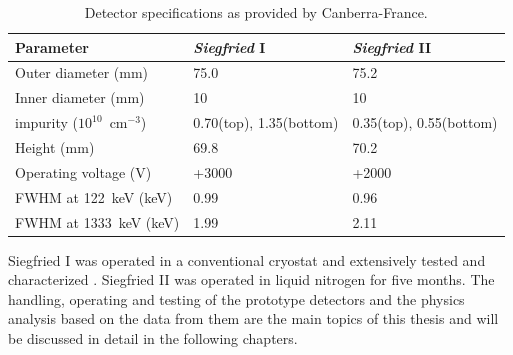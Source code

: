 \begin{table}[tbhp]
\centering
\caption{Detector specifications as provided by Canberra-France.}
\label{tab:tt:detpar}
\begin{tabular}{lll}\\\hline
Parameter & \emph{Siegfried} I  & \emph{Siegfried} II \\\hline
Outer diameter (mm)   & 75.0 & 75.2\\ 
Inner diameter (mm)   & 10 & 10 \\ 
impurity ($10^{10}$~cm$^{-3}$) & 0.70(top), 1.35(bottom) & 0.35(top), 0.55(bottom) \\
Height (mm)           & 69.8 & 70.2 \\\hline 
Operating voltage (V) & +3000 & +2000 \\ 
FWHM at 122~keV (keV)  & 0.99 & 0.96 \\ 
FWHM at 1333~keV (keV) & 1.99 & 2.11 \\ \hline 
\end{tabular}
\end{table}

Siegfried I was operated in a conventional cryostat and extensively tested and characterized \cite{Sie07}. Siegfried II was operated in liquid nitrogen for five months. The handling, operating and testing of the prototype detectors and the physics analysis based on the data from them are the main topics of this thesis and will be discussed in detail in the following chapters.

